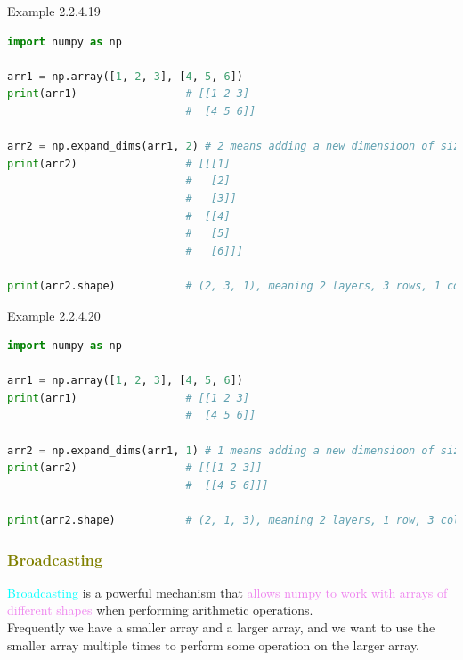 \documentclass{book}
\begin{document}
\begin{egBox}{Example 2.2.4.19}{}
    \begin{lstlisting}[language=Python, basicstyle=\ttfamily\small, keywordstyle=\color{blue}, commentstyle=\color{forestgreen}, stringstyle=\color{red}, showstringspaces=false]
import numpy as np

arr1 = np.array([1, 2, 3], [4, 5, 6])
print(arr1)                 # [[1 2 3]
                            #  [4 5 6]]

arr2 = np.expand_dims(arr1, 2) # 2 means adding a new dimensioon of size 1 after 2nd dimension
print(arr2)                 # [[[1]
                            #   [2]
                            #   [3]]
                            #  [[4]
                            #   [5]
                            #   [6]]]

print(arr2.shape)           # (2, 3, 1), meaning 2 layers, 3 rows, 1 column
    \end{lstlisting}
\end{egBox}
\begin{egBox}{Example 2.2.4.20}{}
    \begin{lstlisting}[language=Python, basicstyle=\ttfamily\small, keywordstyle=\color{blue}, commentstyle=\color{forestgreen}, stringstyle=\color{red}, showstringspaces=false]
import numpy as np

arr1 = np.array([1, 2, 3], [4, 5, 6])
print(arr1)                 # [[1 2 3]
                            #  [4 5 6]]

arr2 = np.expand_dims(arr1, 1) # 1 means adding a new dimensioon of size 1 after 1st dimension
print(arr2)                 # [[[1 2 3]]
                            #  [[4 5 6]]]

print(arr2.shape)           # (2, 1, 3), meaning 2 layers, 1 row, 3 columns
    \end{lstlisting}
\end{egBox}
\textcolor{olive}{\subsubsection{Broadcasting}}

\textcolor{cyan}{Broadcasting} is a powerful mechanism that \textcolor{violet}{allows numpy to work with arrays of different shapes} when performing arithmetic operations.\\

Frequently we have a smaller array and a larger array, and we want to use the smaller array multiple times to perform some operation on the larger array.\\
\end{document}
